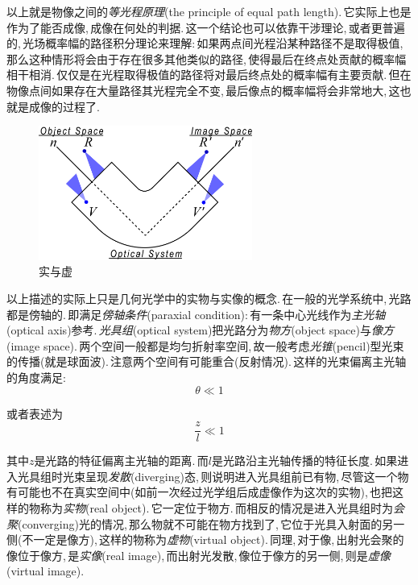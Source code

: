 以上就是物像之间的\emph{等光程原理}(the principle of equal path length).\,它实际上也是作为了能否成像,\,成像在何处的判据.\,这一个结论也可以依靠干涉理论,\,或者更普遍的,\,光场概率幅的路径积分理论来理解:\,如果两点间光程沿某种路径不是取得极值,\,那么这种情形将会由于存在很多其他类似的路径,\,使得最后在终点处贡献的概率幅相干相消.\,仅仅是在光程取得极值的路径将对最后终点处的概率幅有主要贡献.\,但在物像点间如果存在大量路径其光程完全不变,\,最后像点的概率幅将会非常地大,\,这也就是成像的过程了.

\begin{figure}
\centering
\vspace{0cm}
\includegraphics[width=7cm]{image/5-7-2.png}
\caption{实与虚}
\end{figure}
以上描述的实际上只是几何光学中的实物与实像的概念.\,在一般的光学系统中,\,光路都是傍轴的.\,即满足\emph{傍轴条件}(paraxial condition):\,有一条中心光线作为\emph{主光轴}(optical axis)参考.\,\emph{光具组}(optical system)把光路分为\emph{物方}(object space)与\emph{像方}(image space).\,两个空间一般都是均匀折射率空间,\,故一般考虑\emph{光锥}(pencil)型光束的传播(就是球面波).\,注意两个空间有可能重合(反射情况).\,这样的光束偏离主光轴的角度满足:
\[\theta\ll 1\]

或者表述为
\[\frac{z}{l}\ll 1\]

其中\(z\)是光路的特征偏离主光轴的距离.\,而\(l\)是光路沿主光轴传播的特征长度.\,如果进入光具组时光束呈现\emph{发散}(diverging)态,\,则说明进入光具组前已有物,\,尽管这一个物有可能也不在真实空间中(如前一次经过光学组后成虚像作为这次的实物),\,也把这样的物称为\emph{实物}(real object).\,它一定位于物方.\,而相反的情况是进入光具组时为\emph{会聚}(converging)光的情况,\,那么物就不可能在物方找到了,\,它位于光具入射面的另一侧(不一定是像方),\,这样的物称为\emph{虚物}(virtual object).\,同理,\,对于像,\,出射光会聚的像位于像方,\,是\emph{实像}(real image),\,而出射光发散,\,像位于像方的另一侧,\,则是\emph{虚像}(virtual image).

